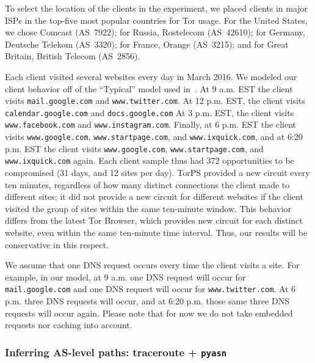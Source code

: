 To select the location of the clients in the experiment, we placed
clients in major ISPs in the top-five most popular countries for Tor
usage. For the United States, we chose Comcast (AS~7922); for Russia,
Rostelecom (AS~42610); for Germany, Deutsche Telekom (AS~3320); for
France, Orange (AS~3215); and for Great Britain, British Telecom (AS~2856).

Each client visited several websites every day in March 2016.  We
modeled our client behavior off of the ``Typical'' model used
in~\cite{Johnson2013a}.  At 9 a.m. EST the client visits
{\tt mail.google.com} and {\tt www.twitter.com}.  At 12 p.m. EST, the client visits
{\tt calendar.google.com} and {\tt docs.google.com} 
At 3 p.m. EST, the client visits {\tt www.facebook.com} and {\tt www.instagram.com}. 
Finally, at 6 p.m. EST the client 
visits {\tt www.google.com}, {\tt www.startpage.com}, and {\tt www.ixquick.com}, 
and at 6:20 p.m. EST the client visits {\tt www.google.com}, {\tt www.startpage.com}, 
and {\tt www.ixquick.com} again. Each client 
sample thus had 372 opportunities to be compromised (31 days, and 12
sites per day).  TorPS 
provided a new circuit every ten minutes, regardless of how many distinct
connections the client made to different sites; it did not provide a new
circuit for different websites if the client visited the group of sites
within the same ten-minute window.  This behavior differs from the
latest Tor Browser, which provides new circuit for each distinct
website, even within the same ten-minute time interval.  Thus, our
results will be conservative in this respect.

We assume that one DNS request occurs every time the client visits a site. For example, 
in our model, at 9 a.m. one DNS request will occur for {\tt mail.google.com} and 
one DNS request will occur for {\tt www.twitter.com}. At 6 p.m. three DNS requests 
will occur, and at 6:20 p.m. those same three DNS requests will occur again. Please note 
that for now we do not take embedded requests nor caching into account.

\subsubsection{Inferring AS-level paths: traceroute + {\tt pyasn}}




